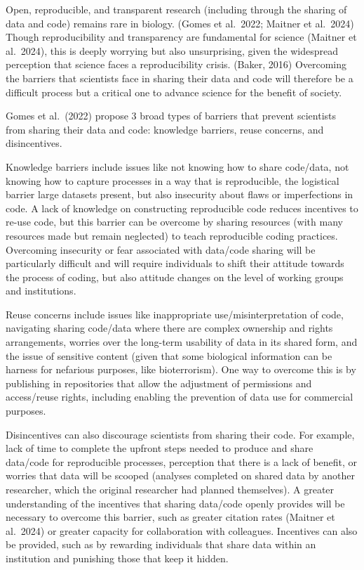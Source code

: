 \documentclass[
]{article}
\begin{document}
Open, reproducible, and transparent research (including through the
sharing of data and code) remains rare in biology. (Gomes et al.~2022;
Maitner et al.~2024) Though reproducibility and transparency are
fundamental for science (Maitner et al.~2024), this is deeply worrying
but also unsurprising, given the widespread perception that science
faces a reproducibility crisis. (Baker, 2016) Overcoming the barriers
that scientists face in sharing their data and code will therefore be a
difficult process but a critical one to advance science for the benefit
of society.

Gomes et al.~(2022) propose 3 broad types of barriers that prevent
scientists from sharing their data and code: knowledge barriers, reuse
concerns, and disincentives.

Knowledge barriers include issues like not knowing how to share
code/data, not knowing how to capture processes in a way that is
reproducible, the logistical barrier large datasets present, but also
insecurity about flaws or imperfections in code. A lack of knowledge on
constructing reproducible code reduces incentives to re-use code, but
this barrier can be overcome by sharing resources (with many resources
made but remain neglected) to teach reproducible coding practices.
Overcoming insecurity or fear associated with data/code sharing will be
particularly difficult and will require individuals to shift their
attitude towards the process of coding, but also attitude changes on the
level of working groups and institutions.

Reuse concerns include issues like inappropriate use/misinterpretation
of code, navigating sharing code/data where there are complex ownership
and rights arrangements, worries over the long-term usability of data in
its shared form, and the issue of sensitive content (given that some
biological information can be harness for nefarious purposes, like
bioterrorism). One way to overcome this is by publishing in repositories
that allow the adjustment of permissions and access/reuse rights,
including enabling the prevention of data use for commercial purposes.

Disincentives can also discourage scientists from sharing their code.
For example, lack of time to complete the upfront steps needed to
produce and share data/code for reproducible processes, perception that
there is a lack of benefit, or worries that data will be scooped
(analyses completed on shared data by another researcher, which the
original researcher had planned themselves). A greater understanding of
the incentives that sharing data/code openly provides will be necessary
to overcome this barrier, such as greater citation rates (Maitner et
al.~2024) or greater capacity for collaboration with colleagues.
Incentives can also be provided, such as by rewarding individuals that
share data within an institution and punishing those that keep it
hidden.
\end{document}

